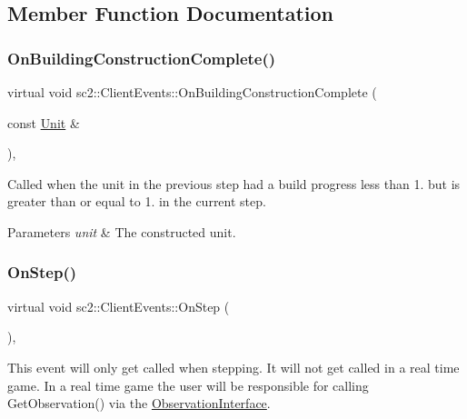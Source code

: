 \subsection{Member Function Documentation}
\mbox{\label{classsc2_1_1_client_events_a635150e0895fb3fed29268f5b53cbd05}} 
\subsubsection{\texorpdfstring{On\+Building\+Construction\+Complete()}{OnBuildingConstructionComplete()}}
{\footnotesize\ttfamily virtual void sc2\+::\+Client\+Events\+::\+On\+Building\+Construction\+Complete (\begin{DoxyParamCaption}\item[{const \hyperlink{classsc2_1_1_unit}{Unit} \&}]{ }\end{DoxyParamCaption})\hspace{0.3cm}{\ttfamily [inline]}, {\ttfamily [virtual]}}

Called when the unit in the previous step had a build progress less than 1. but is greater than or equal to 1. in the current step. 
\begin{DoxyParams}{Parameters}
{\em unit} & The constructed unit. \\
\hline
\end{DoxyParams}
\mbox{\label{classsc2_1_1_client_events_a6f5839e220d2a5a19b30065e0b8290c4}} 
\subsubsection{\texorpdfstring{On\+Step()}{OnStep()}}
{\footnotesize\ttfamily virtual void sc2\+::\+Client\+Events\+::\+On\+Step (\begin{DoxyParamCaption}{ }\end{DoxyParamCaption})\hspace{0.3cm}{\ttfamily [inline]}, {\ttfamily [virtual]}}

This event will only get called when stepping. It will not get called in a real time game. In a real time game the user will be responsible for calling Get\+Observation() via the \hyperlink{classsc2_1_1_observation_interface}{Observation\+Interface}. \mbox{\label{classsc2_1_1_client_events_a28c6dc5471d2a7bacfc6cf289983bcc5}} 
